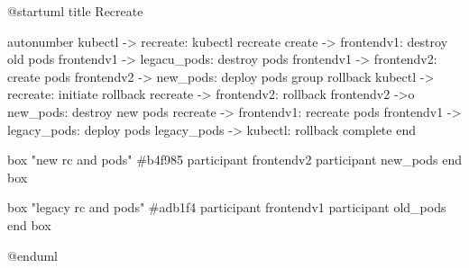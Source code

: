 @startuml
title Recreate

autonumber
kubectl -> recreate: kubectl recreate
create -> frontendv1: destroy old pods
frontendv1 -> legacu_pods: destroy pods
frontendv1 -> frontendv2: create pods
frontendv2 -> new_pods: deploy pods
group rollback
  kubectl -> recreate: initiate rollback
  recreate -> frontendv2: rollback
  frontendv2 ->o new_pods: destroy new pods
  recreate -> frontendv1: recreate pods
  frontendv1 -> legacy_pods: deploy pods
  legacy_pods -> kubectl: rollback complete
end

box "new rc and pods" #b4f985
  participant frontendv2
  participant new_pods
end box

box "legacy rc and pods" #adb1f4
  participant frontendv1
  participant old_pods
end box

@enduml

